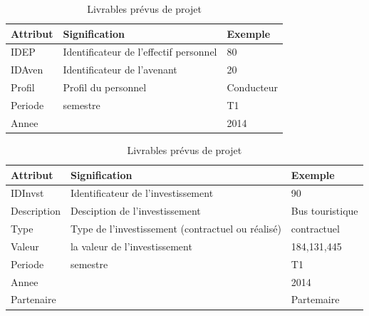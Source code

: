 \documentclass[a4paper]{report}
\begin{document}
\begin{doublespace}
	\begin{table}[H]
		\begin{center}
			\begin{tabularx}{17.5cm}{|X|X|X|}
				\hline
				\textbf{Attribut} & \textbf{Signification}                 &
				\textbf{Exemple}                                                        \\
				\hline
				IDEP              & Identificateur de l'effectif personnel & 80         \\
				\hline
				IDAven            & Identificateur de l'avenant            & 20         \\
				\hline
				Profil            & Profil du personnel                    & Conducteur \\
				\hline
				Periode           & semestre                               & T1         \\
				\hline
				Annee             &                                        & 2014       \\
				\hline
			\end{tabularx}
			\caption{Livrables prévus de projet}
		\end{center}
	\end{table}

	\begin{table}[H]
		\begin{center}
			\begin{tabularx}{17.5cm}{|X|X|X|}
				\hline
				\textbf{Attribut} & \textbf{Signification}                            &
				\textbf{Exemple}                                                                    \\
				\hline
				IDInvst           & Identificateur de l'investissement                & 90          \\
				\hline
				Description       & Desciption de l'investissement                    & Bus
				touristique                                                                         \\
				\hline
				Type              & Type de l'investissement (contractuel ou réalisé) &
				contractuel                                                                         \\
				\hline
				Valeur            & la valeur de l'investissement                     & 184,131,445 \\
				\hline
				Periode           & semestre                                          & T1          \\
				\hline
				Annee             &                                                   & 2014        \\
				\hline
				Partenaire        &                                                   & Partemaire  \\
				\hline
			\end{tabularx}
			\caption{Livrables prévus de projet}
		\end{center}
	\end{table}


\end{doublespace}
\end{document}
